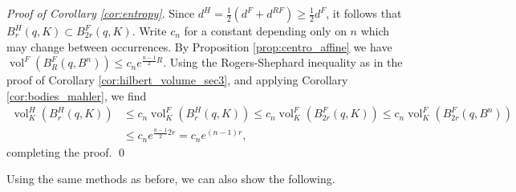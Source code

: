 \documentclass[reqno,10pt]{amsart}
\newcounter{mp}
\DeclareMathOperator{\vol}{vol}
\begin{document}
\textit{Proof of Corollary \ref{cor:entropy}}. Since $d^H=\frac12(d^F+d^{RF})\geq \frac12d^F$, it follows that $B^H_r(q, K)\subset B^F_{2r}(q, K)$.  Write $c_n$ for a constant depending only on $n$ which may change between occurrences. By Proposition \ref{prop:centro_affine} we have $\vol^F(B^F_R(q,B^n))\leq c_ne^{\frac{n-1}{2}R }$. Using the Rogers-Shephard inequality as in the proof of Corollary \ref{cor:hilbert_volume_sec3}, and applying Corollary \ref{cor:bodies_mahler}, we find
\begin{align*} \vol_K^H(B_r^H(q,K))&\leq c_n \vol_K^F(B_r^H(q,K))\leq c_n\vol_K^F(B_{2r}^F(q,K))\leq  c_n\vol_K^F(B_{2r}^F(q,B^n))\\&\leq c_ne^{\frac{n-1}{2}2r}=c_ne^{(n-1)r},\end{align*}
completing the proof. \qed

Using the same methods as before, we can also show the following.
\end{document}
